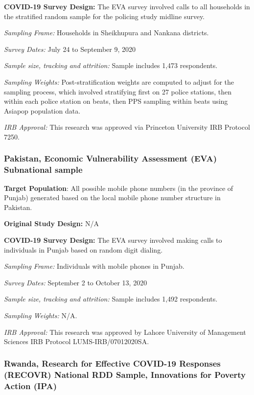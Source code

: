 \documentclass[
  12pt,
]{article}
\begin{document}
\textbf{COVID-19 Survey Design:} The EVA survey involved calls to all households in the stratified random sample for the policing study midline survey.

\emph{Sampling Frame:} Households in Sheikhupura and Nankana districts.

\emph{Survey Dates:} July 24 to September 9, 2020

\emph{Sample size, tracking and attrition:} Sample includes 1,473 respondents.

\emph{Sampling Weights:} Post-stratification weights are computed to adjust for the sampling process, which involved stratifying first on 27 police stations, then within each police station on beats, then PPS sampling within beats using Asiapop population data.

\emph{IRB Approval:} This research was approved via Princeton University IRB Protocol 7250.

\hypertarget{pakistan-economic-vulnerability-assessment-eva-subnational-sample}{%
\subsubsection*{Pakistan, Economic Vulnerability Assessment (EVA) Subnational sample}\label{pakistan-economic-vulnerability-assessment-eva-subnational-sample}}

\textbf{Target Population}: All possible mobile phone numbers (in the province of Punjab) generated based on the local mobile phone number structure in Pakistan.

\textbf{Original Study Design:} N/A

\textbf{COVID-19 Survey Design:} The EVA survey involved making calls to individuals in Punjab based on random digit dialing.

\emph{Sampling Frame:} Individuals with mobile phones in Punjab.

\emph{Survey Dates:} September 2 to October 13, 2020

\emph{Sample size, tracking and attrition:} Sample includes 1,492 respondents.

\emph{Sampling Weights:} N/A.

\emph{IRB Approval:} This research was approved by Lahore University of Management Sciences IRB Protocol LUMS-IRB/07012020SA.

\hypertarget{rwanda-research-for-effective-covid-19-responses-recovr-national-rdd-sample-innovations-for-poverty-action-ipa}{%
\subsubsection*{Rwanda, Research for Effective COVID-19 Responses (RECOVR) National RDD Sample, Innovations for Poverty Action (IPA)}\label{rwanda-research-for-effective-covid-19-responses-recovr-national-rdd-sample-innovations-for-poverty-action-ipa}}
\end{document}
